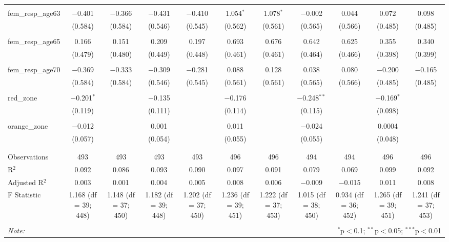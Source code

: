 \begin{table}[!htbp]
\begin{tabular}{@{\extracolsep{5pt}}lcccccccccc}
  & & & & & & & & & & \\ 
 fem\_resp\_age63 & $-$0.401 & $-$0.366 & $-$0.431 & $-$0.410 & 1.054$^{*}$ & 1.078$^{*}$ & $-$0.002 & 0.044 & 0.072 & 0.098 \\ 
  & (0.584) & (0.584) & (0.546) & (0.545) & (0.562) & (0.561) & (0.565) & (0.566) & (0.485) & (0.485) \\ 
  & & & & & & & & & & \\ 
 fem\_resp\_age65 & 0.166 & 0.151 & 0.209 & 0.197 & 0.693 & 0.676 & 0.642 & 0.625 & 0.355 & 0.340 \\ 
  & (0.479) & (0.480) & (0.449) & (0.448) & (0.461) & (0.461) & (0.464) & (0.466) & (0.398) & (0.399) \\ 
  & & & & & & & & & & \\ 
 fem\_resp\_age70 & $-$0.369 & $-$0.333 & $-$0.309 & $-$0.281 & 0.088 & 0.128 & 0.038 & 0.080 & $-$0.200 & $-$0.165 \\ 
  & (0.584) & (0.584) & (0.546) & (0.545) & (0.561) & (0.561) & (0.565) & (0.566) & (0.485) & (0.485) \\ 
  & & & & & & & & & & \\ 
 red\_zone & $-$0.201$^{*}$ &  & $-$0.135 &  & $-$0.176 &  & $-$0.248$^{**}$ &  & $-$0.169$^{*}$ &  \\ 
  & (0.119) &  & (0.111) &  & (0.114) &  & (0.115) &  & (0.098) &  \\ 
  & & & & & & & & & & \\ 
 orange\_zone & $-$0.012 &  & 0.001 &  & 0.011 &  & $-$0.024 &  & 0.0004 &  \\ 
  & (0.057) &  & (0.054) &  & (0.055) &  & (0.055) &  & (0.048) &  \\ 
  & & & & & & & & & & \\ 
\hline \\[-1.8ex] 
Observations & 493 & 493 & 493 & 493 & 496 & 496 & 494 & 494 & 496 & 496 \\ 
R$^{2}$ & 0.092 & 0.086 & 0.093 & 0.090 & 0.097 & 0.091 & 0.079 & 0.069 & 0.099 & 0.092 \\ 
Adjusted R$^{2}$ & 0.003 & 0.001 & 0.004 & 0.005 & 0.008 & 0.006 & $-$0.009 & $-$0.015 & 0.011 & 0.008 \\ 
F Statistic & 1.168 (df = 39; 448) & 1.148 (df = 37; 450) & 1.182 (df = 39; 448) & 1.202 (df = 37; 450) & 1.236 (df = 39; 451) & 1.222 (df = 37; 453) & 1.015 (df = 38; 450) & 0.934 (df = 36; 452) & 1.265 (df = 39; 451) & 1.241 (df = 37; 453) \\ 
\hline 
\hline \\[-1.8ex] 
\textit{Note:}  & \multicolumn{10}{r}{$^{*}$p$<$0.1; $^{**}$p$<$0.05; $^{***}$p$<$0.01} \\ 
\end{tabular} 
\end{table} 
